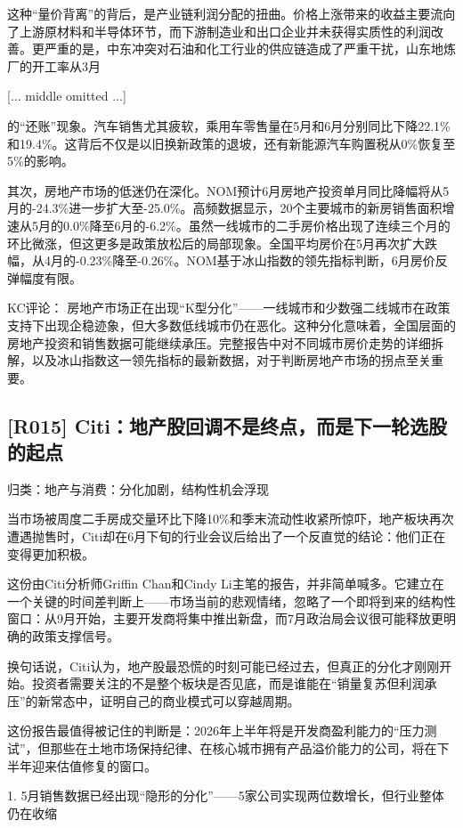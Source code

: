 \documentclass[11pt]{ctexart}
\begin{document}
这种“量价背离”的背后，是产业链利润分配的扭曲。价格上涨带来的收益主要流向了上游原材料和半导体环节，而下游制造业和出口企业并未获得实质性的利润改善。更严重的是，中东冲突对石油和化工行业的供应链造成了严重干扰，山东地炼厂的开工率从3月

[... middle omitted ...]

的“还账”现象。汽车销售尤其疲软，乘用车零售量在5月和6月分别同比下降22.1\%和19.4\%。这背后不仅是以旧换新政策的退坡，还有新能源汽车购置税从0\%恢复至5\%的影响。

其次，房地产市场的低迷仍在深化。NOM预计6月房地产投资单月同比降幅将从5月的-24.3\%进一步扩大至-25.0\%。高频数据显示，20个主要城市的新房销售面积增速从5月的0.0\%降至6月的-6.2\%。虽然一线城市的二手房价格出现了连续三个月的环比微涨，但这更多是政策放松后的局部现象。全国平均房价在5月再次扩大跌幅，从4月的-0.23\%降至-0.26\%。NOM基于冰山指数的领先指标判断，6月房价反弹幅度有限。

KC评论： 房地产市场正在出现“K型分化”——一线城市和少数强二线城市在政策支持下出现企稳迹象，但大多数低线城市仍在恶化。这种分化意味着，全国层面的房地产投资和销售数据可能继续承压。完整报告中对不同城市房价走势的详细拆解，以及冰山指数这一领先指标的最新数据，对于判断房地产市场的拐点至关重要。

\subsection{[R015] Citi：地产股回调不是终点，而是下一轮选股的起点}
{\small\color{refgray}归类：地产与消费：分化加剧，结构性机会浮现}

当市场被周度二手房成交量环比下降10\%和季末流动性收紧所惊吓，地产板块再次遭遇抛售时，Citi却在6月下旬的行业会议后给出了一个反直觉的结论：他们正在变得更加积极。

这份由Citi分析师Griffin Chan和Cindy Li主笔的报告，并非简单喊多。它建立在一个关键的时间差判断上——市场当前的悲观情绪，忽略了一个即将到来的结构性窗口：从9月开始，主要开发商将集中推出新盘，而7月政治局会议很可能释放更明确的政策支撑信号。

换句话说，Citi认为，地产股最恐慌的时刻可能已经过去，但真正的分化才刚刚开始。投资者需要关注的不是整个板块是否见底，而是谁能在“销量复苏但利润承压”的新常态中，证明自己的商业模式可以穿越周期。

这份报告最值得被记住的判断是：2026年上半年将是开发商盈利能力的“压力测试”，但那些在土地市场保持纪律、在核心城市拥有产品溢价能力的公司，将在下半年迎来估值修复的窗口。

1. 5月销售数据已经出现“隐形的分化”——5家公司实现两位数增长，但行业整体仍在收缩
\end{document}

